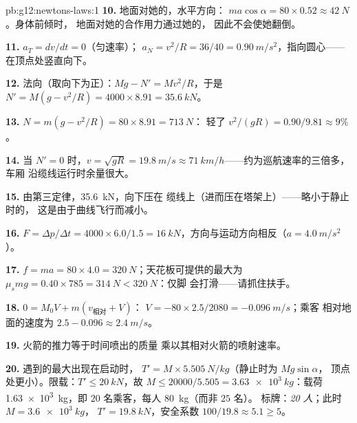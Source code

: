 \begin{solution}{pb:g12:newtons-laws:1}
\textbf{10.} 地面对她的，水平方向：
$ma\cos\alpha = 80 \times 0.52 \approx \qty{42}{N}$。身体前倾时，
地面对她的合作用力通过她的，
因此不会使她翻倒。

\textbf{11.} $a_T = dv/dt = 0$（匀速率）；
$a_N = v^2/R = 36/40 = \qty{0.90}{m/s^2}$，指向圆心——
在顶点处竖直向下。

\textbf{12.} 法向（取向下为正）：$Mg - N' = Mv^2/R$，于是
$N' = M(g - v^2/R) = 4000 \times 8.91 = \qty{35.6}{kN}$。

\textbf{13.} $N = m(g - v^2/R) = 80 \times 8.91 = \qty{713}{N}$：
轻了 $v^2/(gR) = 0.90/9.81 \approx 9\%$。

\textbf{14.} 当 $N' = 0$ 时，$v = \sqrt{gR} = \qty{19.8}{m/s} \approx
\qty{71}{km/h}$——约为巡航速率的三倍多，车厢
沿缆线运行时余量很大。

\textbf{15.} 由第三定律，\qty{35.6}{kN}，向下压在
缆线上（进而压在塔架上）——略小于静止时的，
这是由于曲线飞行而减小。

\textbf{16.} $F = \Delta p/\Delta t = 4000 \times 6.0/1.5 =
\qty{16}{kN}$，方向与运动方向相反（$a = \qty{4.0}{m/s^2}$）。

\textbf{17.} $f = ma = 80 \times 4.0 = \qty{320}{N}$；天花板可提供的最大为
$\mu_s mg = 0.40 \times 785 = \qty{314}{N} < \qty{320}{N}$：仅脚
会打滑——请抓住扶手。

\textbf{18.} $0 = M_0 V + m(v_{\text{相对}} + V)$：
$V = -80 \times 2.5/2080 = \qty{-0.096}{m/s}$；乘客
相对地面的速度为 $2.5 - 0.096 \approx \qty{2.4}{m/s}$。

\textbf{19.} 火箭的推力等于时间喷出的质量
乘以其相对火箭的喷射速率。

\textbf{20.} 遇到的最大出现在启动时，
$T' = M \times \qty{5.505}{N/kg}$（静止时为 $Mg\sin\alpha$，
顶点处更小）。限载：$T' \leq \qty{20}{kN}$，故
$M \leq 20000/5.505 = \qty{3.63e3}{kg}$：载荷
\qty{1.63e3}{kg}，即 $20$ 名乘客，每人 \qty{80}{kg}（而非 $25$ 名）。
标牌：\emph{20 人}；此时 $M = \qty{3.6e3}{kg}$，
$T' = \qty{19.8}{kN}$，安全系数 $100/19.8 \approx 5.1 \geq 5$。
\end{solution}
